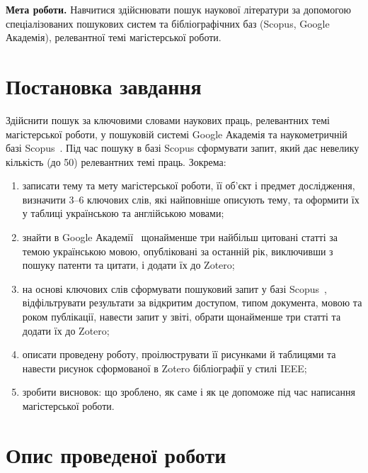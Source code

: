 \documentclass[14pt,a4paper]{extreport}
\begin{document}

\textbf{Мета роботи.} Навчитися здійснювати пошук наукової літератури за допомогою спеціалізованих пошукових систем та бібліографічних баз (Scopus, Google Академія), релевантної темі магістерської роботи.

\section{Постановка завдання}

Здійснити пошук за ключовими словами наукових праць, релевантних темі магістерської роботи, у пошуковій системі Google Академія та наукометричній базі Scopus~\cite{guide}. Під час пошуку в базі Scopus сформувати запит, який дає невелику кількість (до 50) релевантних темі праць. Зокрема:

\begin{enumerate}
\item записати тему та мету магістерської роботи, її об'єкт і предмет дослідження, визначити 3--6 ключових слів, які найповніше описують тему, та оформити їх у таблиці українською та англійською мовами;

\item знайти в Google Академії~\cite{scholar} щонайменше три найбільш цитовані статті за темою українською мовою, опубліковані за останній рік, виключивши з пошуку патенти та цитати, і додати їх до Zotero;

\item на основі ключових слів сформувати пошуковий запит у базі Scopus~\cite{scopus}, відфільтрувати результати за відкритим доступом, типом документа, мовою та роком публікації, навести запит у звіті, обрати щонайменше три статті та додати їх до Zotero;

\item описати проведену роботу, проілюструвати її рисунками й таблицями та навести рисунок сформованої в Zotero бібліографії у стилі IEEE;

\item зробити висновок: що зроблено, як саме і як це допоможе під час написання магістерської роботи.
\end{enumerate}

\section{Опис проведеної роботи}
\end{document}

